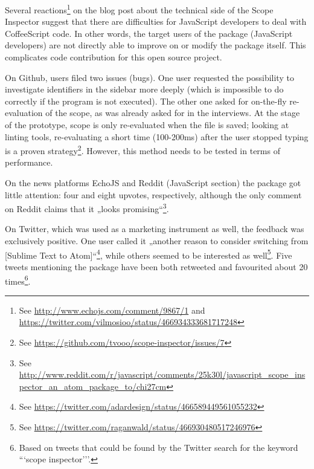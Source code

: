 Several
reactions\footnote{See \url{http://www.echojs.com/comment/9867/1} and \url{https://twitter.com/vilmosioo/status/466934333681717248}}
on the blog post about the technical side of the Scope Inspector
\cite{tvo} suggest that there are difficulties for JavaScript developers
to deal with CoffeeScript code. In other words, the target users of the
package (JavaScript developers) are not directly able to improve on or
modify the package itself. This complicates code contribution for this
open source project.

On Github, users filed two issues (bugs). One user requested the
possibility to investigate identifiers in the sidebar more deeply (which
is impossible to do correctly if the program is not executed). The other
one asked for on-the-fly re-evaluation of the scope, as was already
asked for in the interviews. At the stage of the prototype, scope is
only re-evaluated when the file is saved; looking at linting tools,
re-evaluating a short time (100-200ms) after the user stopped typing is
a proven
strategy\footnote{See \url{https://github.com/tvooo/scope-inspector/issues/7}}.
However, this method needs to be tested in terms of performance.

On the news platforms EchoJS and Reddit (JavaScript section) the package
got little attention: four and eight upvotes, respectively, although the
only comment on Reddit claims that it „looks
promising“\footnote{See \url{http://www.reddit.com/r/javascript/comments/25k30l/javascript_scope_inspector_an_atom_package_to/chi27cm}}.

On Twitter, which was used as a marketing instrument as well, the
feedback was exclusively positive. One user called it „another reason to
consider switching from {[}Sublime Text to
Atom{]}“\footnote{See \url{https://twitter.com/adardesign/status/466589449561055232}},
while others seemed to be interested as
well\footnote{See \url{https://twitter.com/raganwald/status/466930480517246976}}.
Five tweets mentioning the package have been both retweeted and
favourited about 20
times\footnote{Based on tweets that could be found by the Twitter search for the keyword ```scope inspector’’’.}.
